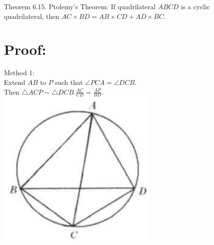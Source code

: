 \documentclass[10pt]{article}
\begin{document}
Theorem 6.15. Ptolemy's Theorem: If quadrilateral \(A B C D\) is a cyclic quadrilateral, then \(A C \times B D=A B \times C D+A D \times B C\).

\section*{Proof:}
Method 1:\\
Extend \(A B\) to \(P\) such that \(\angle P C A=\angle D C B\).\\
Then \(\triangle A C P \sim \triangle D C B . \frac{A C}{C D}=\frac{A P}{B D}\).\\
\includegraphics[max width=\textwidth, center]{2025_04_17_97bc1f7e44d93c271a88g-193(2)}
\end{document}
